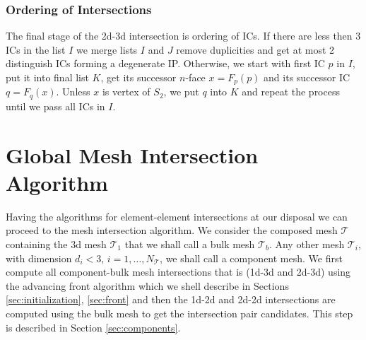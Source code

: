 \documentclass{elsarticle}
\newcommand{\notePE}[1]{{\color{Orange} \textbf{PE: } \textit{#1}}}
\newcommand{\nface}{$n$-face }
\begin{document}
% 
% 
\subsubsection{Ordering of Intersections}
\label{sec:ordering}
The final stage of the 2d-3d intersection is ordering of ICs. If there are less then 3 ICs in the list $I$ we merge lists $I$ and $J$ remove duplicities
and get at most 2 distinguish ICs forming a degenerate IP. Otherwise, we start with first IC $p$ in $I$, put it into final list $K$, 
get its successor \nface $x = F_p(p)$ and its successor IC $q=F_q(x)$. Unless $x$ is vertex of $S_2$, we put $q$ into $K$ and repeat the process until 
we pass all ICs in $I$.

  

\section{Global Mesh Intersection Algorithm}
\label{sec:front_advancing}
Having the algorithms for element-element intersections at our disposal we can proceed to the mesh intersection algorithm. 
We consider the composed mesh $\mathcal T$ containing the 3d mesh $\mathcal T_1$ that we shall call a bulk mesh $\mathcal T_b$. Any other 
mesh $\mathcal T_i$, with dimension $d_i < 3$, $i=1,\dots, N_{\mathcal T}$, we shall call a component mesh. 
We first compute all component-bulk mesh intersections that is (1d-3d and 2d-3d) using the advancing front algorithm which we shell describe in Sections 
\ref{sec:initialization}, \ref{sec:front} and then the 1d-2d and 2d-2d 
intersections are computed using the bulk mesh to get the intersection pair candidates. This step is described in Section \ref{sec:components}.
\end{document}

